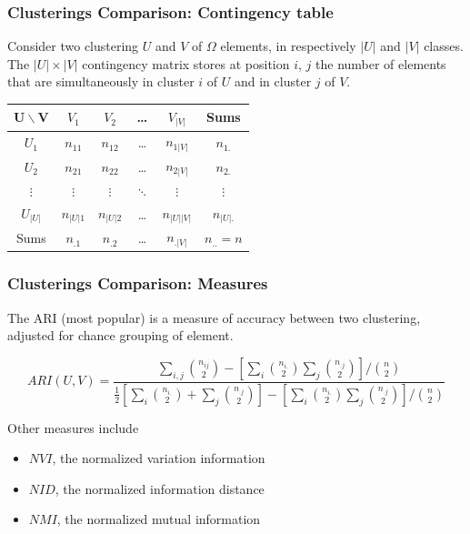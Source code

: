 \documentclass{beamer}\usepackage[]{graphicx}\usepackage[]{color}
\begin{document}
\begin{frame}
  \frametitle{Clusterings Comparison: Contingency table}

  \begin{definition}
    Consider two clustering $U$ and $V$ of $\Omega$ elements, in respectively $|U|$ and $|V|$ classes. The $|U| \times |V|$ contingency matrix stores at position $i$, $j$ the number of elements that
are simultaneously in cluster $i$ of $U$ and in cluster $j$ of $V$.

\begin{center}  
  \begin{tabular}{c|cccc|c}
  $\mathbf{U}\backslash \mathbf{V}$ & $V_1$ & $V_2$ & \dots & $V_{|V|}$ & Sums \\ \hline  
  $U_1$ & $n_{11}$ & $n_{12}$ & \dots & $n_{1|V|}$ & $n_{1.}$ \\ 
  $U_2$ & $n_{21}$ & $n_{22}$ & \dots & $n_{2|V|}$ & $n_{2.}$ \\ 
  $\vdots$ & $\vdots$ & $\vdots$ & $\ddots$ & $\vdots$ & $\vdots$ \\
  $U_{|U|}$ & $n_{|U|1}$ & $n_{|U|2}$ & \dots & $n_{|U| |V|}$ & $n_{|U|.}$ \\ \hline
  Sums & $n_{.1}$ & $n_{.2}$ & \dots & $n_{.|V|}$ & $n_{..}=n$ \\
\end{tabular}
\end{center}  

  \end{definition}
  
\end{frame}

\begin{frame}
  \frametitle{Clusterings Comparison: Measures}

  The ARI (most popular) is a measure of accuracy between two clustering, adjusted for chance grouping of element.

  \begin{definition}
	\begin{displaymath}
		ARI(U, V) = 
			\frac{ 
			\sum_{i,j} {n_{ij} \choose 2} - 
			\left[ \sum_i {n_{i.} \choose 2} \sum_j {n_{.j} \choose 2} \right] 
			/ {n \choose 2} }
		     	{ 
			\frac{1}{2} \left[ \sum_i {n_{i.} \choose 2} + \sum_j {n_{.j} \choose 2} \right] -
			\left[ \sum_i {n_{i.} \choose 2} \sum_j {n_{.j} \choose 2} \right] 
			/ {n \choose 2} 
			}
	\end{displaymath}
  \end{definition}
  
  Other measures include \cite{vinh08}
  \begin{itemize}
    \item $NVI$, the normalized variation information
    \item $NID$, the normalized information distance
    \item $NMI$, the normalized mutual information
  \end{itemize}
  
\end{frame}
\end{document}
